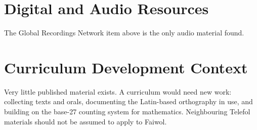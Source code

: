 \documentclass[12pt]{article}
\begin{document}
\section{Digital and Audio Resources}
The Global Recordings Network item above is the only audio material found.

\section{Curriculum Development Context}
Very little published material exists. A curriculum would need new work: collecting texts and orals, documenting the Latin-based orthography in use, and building on the base-27 counting system for mathematics. Neighbouring Telefol materials should not be assumed to apply to Faiwol.
\end{document}
